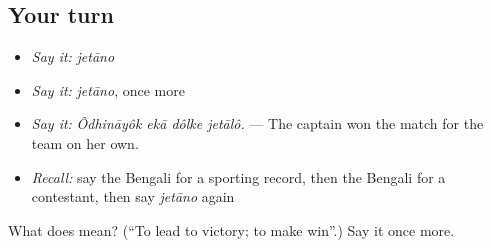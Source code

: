 \subsection*{Your turn}
\begin{itemize}
\raggedright
  \item \emph{Say it:} \emph{jetāno}
  \item \emph{Say it:} \emph{jetāno}, once more
  \item \emph{Say it:} \emph{Ôdhināyôk ekā dôlke jetālô.} — The captain won the match for the team on her own.
  \item \emph{Recall:} say the Bengali for a sporting record, then the Bengali for a contestant, then say \emph{jetāno} again
\end{itemize}

\begin{tcolorbox}[breakable,colback=teal!4,colframe=teal!35!black,title={Before you move on}]
What does  mean? (\textquotedblleft{}To lead to victory; to make win\textquotedblright{}.) Say it once more.
\end{tcolorbox}
